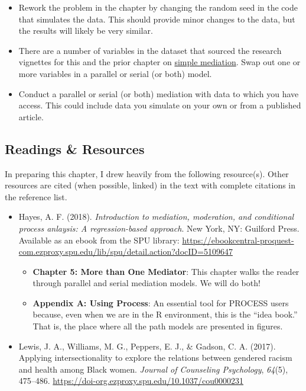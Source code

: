 \documentclass[
  11pt,
]{book}
\providecommand{\tightlist}{%
  \setlength{\itemsep}{0pt}\setlength{\parskip}{0pt}}
\begin{document}
\begin{itemize}
\tightlist
\item
  Rework the problem in the chapter by changing the random seed in the code that simulates the data. This should provide minor changes to the data, but the results will likely be very similar.
\item
  There are a number of variables in the dataset that sourced the research vignettes for this and the prior chapter on \protect\hyperlink{SimpleMed}{simple mediation}. Swap out one or more variables in a parallel or serial (or both) model.
\item
  Conduct a parallel or serial (or both) mediation with data to which you have access. This could include data you simulate on your own or from a published article.
\end{itemize}

\hypertarget{readings-resources-5}{%
\subsection{Readings \& Resources}\label{readings-resources-5}}

In preparing this chapter, I drew heavily from the following resource(s). Other resources are cited (when possible, linked) in the text with complete citations in the reference list.

\begin{itemize}
\tightlist
\item
  Hayes, A. F. (2018). \emph{Introduction to mediation, moderation, and conditional process anlaysis: A regression-based approach}. New York, NY: Guilford Press. Available as an ebook from the SPU library: \url{https://ebookcentral-proquest-com.ezproxy.spu.edu/lib/spu/detail.action?docID=5109647}

  \begin{itemize}
  \tightlist
  \item
    \textbf{Chapter 5: More than One Mediator}: This chapter walks the reader through parallel and serial mediation models. We will do both!
  \item
    \textbf{Appendix A: Using Process}: An essential tool for PROCESS users because, even when we are in the R environment, this is the ``idea book.'' That is, the place where all the path models are presented in figures.
  \end{itemize}
\item
  Lewis, J. A., Williams, M. G., Peppers, E. J., \& Gadson, C. A. (2017). Applying intersectionality to explore the relations between gendered racism and health among Black women. \emph{Journal of Counseling Psychology}, \emph{64}(5), 475--486. \url{https://doi-org.ezproxy.spu.edu/10.1037/cou0000231}
\end{itemize}
\end{document}
